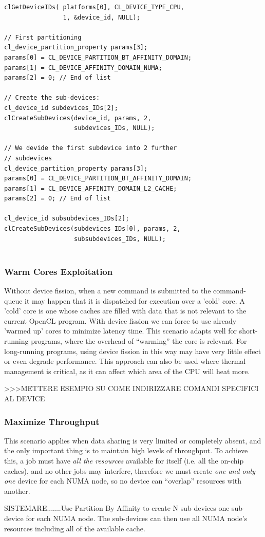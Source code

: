 {\footnotesize\begin{verbatim}
clGetDeviceIDs( platforms[0], CL_DEVICE_TYPE_CPU,
                1, &device_id, NULL);

// First partitioning
cl_device_partition_property params[3];
params[0] = CL_DEVICE_PARTITION_BT_AFFINITY_DOMAIN;
params[1] = CL_DEVICE_AFFINITY_DOMAIN_NUMA; 
params[2] = 0; // End of list

// Create the sub-devices:
cl_device_id subdevices_IDs[2];
clCreateSubDevices(device_id, params, 2,
                   subdevices_IDs, NULL);
									
// We devide the first subdevice into 2 further
// subdevices
cl_device_partition_property params[3];
params[0] = CL_DEVICE_PARTITION_BT_AFFINITY_DOMAIN;
params[1] = CL_DEVICE_AFFINITY_DOMAIN_L2_CACHE; 
params[2] = 0; // End of list

cl_device_id subsubdevices_IDs[2];
clCreateSubDevices(subdevices_IDs[0], params, 2,
                   subsubdevices_IDs, NULL);


\end{verbatim}}

\subsubsection{Warm Cores Exploitation}
Without device fission, when a new command is submitted to the command-queue it may happen that it is dispatched for execution over a 'cold' core. A 'cold' core is one whose caches are filled with data that is not relevant to the current OpenCL program. With device fission we can force to use already 'warmed up' cores to minimize latency time.
This scenario adapts well for short-running programs, where the overhead of "`warming"' the core is relevant. For long-running programs, using device fission in this way may have very little effect or even degrade performance.
This approach can also be used where thermal management is critical, as it can affect which area of the CPU will heat more.

>>>METTERE ESEMPIO SU COME INDIRIZZARE COMANDI SPECIFICI AL DEVICE

\subsubsection{Maximize Throughput}
This scenario applies when data sharing is very limited or completely absent, and the only important thing is to maintain high levels of throughput. To achieve this, a job must have \textit{all the resources} available for itself (i.e. all the on-chip caches), and no other jobs may interfere, therefore we must create \emph{one and only one} device for each NUMA node, so no device can "`overlap"' resources with another.

SISTEMARE.......Use Partition By Affinity to create N sub-devices one sub-device for each NUMA node.
The sub-devices can then use all NUMA node's resources including all of the available cache.






